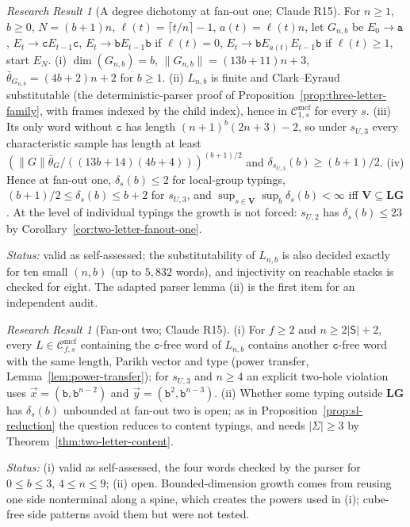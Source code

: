 \documentclass[11pt]{article}
\numberwithin{equation}{section}
\theoremstyle{plain}
\theoremstyle{definition}
\theoremstyle{remark}
\newtheorem{rresult}[theorem]{Research Result}
\newcommand{\Cmcf}[2]{\mathcal{C}^{\mathrm{mcf}}_{#1,#2}}
\newcommand{\tuple}[1]{\vec{#1}}
\theoremstyle{plain}
\begin{document}
\begin{rresult}[A degree dichotomy at fan-out one; Claude R15]
\label{rr:R15-fanout-one}
For $n\ge1$, $b\ge0$, $N=(b+1)n$, $\ell(t)=\lceil t/n\rceil-1$, $a(t)=\ell(t)n$, let $G_{n,b}$ be
$E_0\to\mathtt a$, $E_t\to\mathtt cE_{t-1}\mathtt c$, $E_t\to\mathtt bE_{t-1}\mathtt b$ if $\ell(t)=0$,
$E_t\to\mathtt bE_{a(t)}E_{t-1}\mathtt b$ if $\ell(t)\ge1$, start $E_N$.  (i) $\dim(G_{n,b})=b$,
$\|G_{n,b}\|=(13b+11)n+3$, $\bar\theta_{G_{n,b}}=(4b+2)n+2$ for $b\ge1$.  (ii) $L_{n,b}$ is finite and
Clark--Eyraud substitutable (the deterministic-parser proof of Proposition~\ref{prop:three-letter-family},
with frames indexed by the child index), hence in $\Cmcf{1}{s}$ for every $s$.  (iii) Its only word without
$\mathtt c$ has length $(n+1)^b(2n+3)-2$, so under $s_{U,3}$ every characteristic sample has length at least
$(\|G\|\bar\theta_G/((13b+14)(4b+4)))^{(b+1)/2}$ and $\delta_{s_{U,3}}(b)\ge(b+1)/2$.  (iv) Hence at fan-out one,
$\delta_s(b)\le2$ for local-group typings, $(b+1)/2\le\delta_s(b)\le b+2$ for $s_{U,3}$, and
$\sup_{s\in\mathbf V}\sup_b\delta_s(b)<\infty$ iff $\mathbf V\subseteq\mathbf{LG}$.  At the level of individual
typings the growth is not forced: $s_{U,2}$ has $\delta_s(b)\le23$ by Corollary~\ref{cor:two-letter-fanout-one}.
\end{rresult}
\noindent\emph{Status:} valid as self-assessed; the substitutability of $L_{n,b}$ is also decided exactly
for ten small $(n,b)$ (up to $5{,}832$ words), and injectivity on reachable stacks is checked for eight.
The adapted parser lemma (ii) is the first item for an independent audit.

\begin{rresult}[Fan-out two; Claude R15]
\label{rr:R15-fanout-two}
(i) For $f\ge2$ and $n\ge2|\mathsf S|+2$, every $L\in\Cmcf{f}{s}$ containing the $\mathtt c$-free word of
$L_{n,b}$ contains another $\mathtt c$-free word with the same length, Parikh vector and type (power transfer,
Lemma~\ref{lem:power-transfer}); for $s_{U,3}$ and $n\ge4$ an explicit two-hole violation uses
$\tuple x=(\mathtt b,\mathtt b^{n-2})$ and $\tuple y=(\mathtt b^2,\mathtt b^{n-3})$.  (ii) Whether some typing outside
$\mathbf{LG}$ has $\delta_s(b)$ unbounded at fan-out two is open; as in
Proposition~\ref{prop:sl-reduction} the question reduces to content typings, and needs $|\Sigma|\ge3$ by
Theorem~\ref{thm:two-letter-content}.
\end{rresult}
\noindent\emph{Status:} (i) valid as self-assessed, the four words checked by the parser for $0\le b\le3$,
$4\le n\le9$; (ii) open.  Bounded-dimension growth comes from reusing one side nonterminal along a spine,
which creates the powers used in (i); cube-free side patterns avoid them but were not tested.
\end{document}
